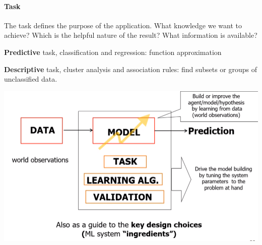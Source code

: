 \documentclass[10pt]{report}
\begin{document}
\paragraph{Task} The task defines the purpose of the application. What knowledge we want to achieve? Which is the helpful nature of the result? What information is available? \begin{list}{}{}
	\item \textbf{Predictive} task, classification and regression: function approximation
	\item \textbf{Descriptive} task, cluster analysis and association rules: find subsets or groups of unclassified data.
\end{list}
\begin{center}
	\includegraphics[scale=0.5]{1.png}
\end{center}
\end{document}
